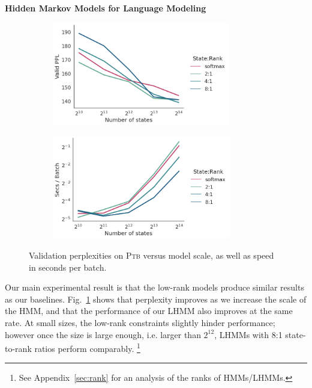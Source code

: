 \documentclass{article}
\begin{document}
\textbf{Hidden Markov Models for Language Modeling}
\begin{figure}[t]
\begin{subfigure}[t]{0.40\textwidth}
\includegraphics[height=4.5cm,trim={0 0 5cm 0}, clip]{imgs/hmm/lhmm-states-features-dropout.png}
\end{subfigure}
\hspace{1.5em}
\begin{subfigure}[t]{0.50\textwidth}
\includegraphics[height=4.5cm]{imgs/hmm/lhmm-states-features-speed-log.png}
\end{subfigure}
\caption{
\label{fig:hmm-ppl-features-dropout}
Validation perplexities on \textsc{Ptb} versus model scale, as well as speed in seconds per batch.
}
\end{figure}
Our main experimental result is that the low-rank models produce similar results as our baselines.
Fig.~\ref{fig:hmm-ppl-features-dropout} shows that perplexity improves as we increase the scale of the HMM, and
that the performance of our LHMM also improves at the same rate.
At small sizes, the low-rank constraints slightly hinder performance; however
once the size is large enough, i.e. larger than $2^{12}$, LHMMs with 8:1 state-to-rank ratios perform comparably. \footnote{
See Appendix~\ref{sec:rank} for an analysis of the ranks of HMMs/LHMMs.}
\end{document}
